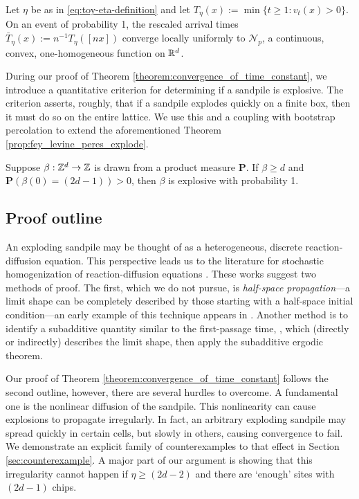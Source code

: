\documentclass[12pt]{amsart}
\begin{document}
\begin{theorem} \label{theorem:convergence_of_time_constant}
	Let $\eta$ be as in \eqref{eq:toy-eta-definition} and let $T_{\eta}(x) := \min\{t \geq 1 : v_t(x) > 0 \}$. On an event of probability 1, the rescaled arrival times $\bar{T}_{\eta}(x) := n^{-1} T_{\eta}([ n x])$
	converge locally uniformly to $\mathcal{N}_{p}$, a continuous, convex, one-homogeneous function on $\mathbb{R}^d$. 
\end{theorem}
During our proof of Theorem \ref{theorem:convergence_of_time_constant}, we introduce a quantitative criterion for determining if a sandpile is explosive. The criterion asserts, roughly, that if a sandpile explodes quickly on a finite box, then it must do so on the entire lattice. 
We use this and a coupling with bootstrap percolation to extend the aforementioned Theorem \ref{prop:fey_levine_peres_explode}. 
\begin{theorem} \label{theorem:explosive}
	Suppose $\beta:\mathbb{Z}^d \to \mathbb{Z}$ is drawn from a product measure $\mathbf{P}$.  If $\beta \geq d$ and $\mathbf{P}(\beta(0) = (2 d - 1)) > 0$,
	then $\beta$ is explosive with probability 1.
\end{theorem}



\subsection{Proof outline}
An exploding sandpile may be thought of as a heterogeneous, discrete reaction-diffusion equation. This perspective leads us to the literature for stochastic homogenization of reaction-diffusion equations \cite{zhang2020long, feldman2019mean, lin2019stochastic, armstrong2018stochastic, caffarelli2014counter, gravner2006random, ishii1999threshold, barles1998new, gravner1996first,gravner1993threshold, willson1978convergence}. These works suggest two methods of proof. The first, which we do not pursue, is {\it half-space propagation}---a limit shape can be completely described by those starting with a half-space initial condition---an early example of this technique appears in \cite{willson1978convergence}. 
Another method is to identify a subadditive quantity similar to the first-passage time, \cite{cox1981some}, which (directly or indirectly) describes the limit shape, then apply the subadditive ergodic theorem.


Our proof of Theorem \ref{theorem:convergence_of_time_constant} follows the second outline,
however, there are several hurdles to overcome. A fundamental one is the nonlinear diffusion of the sandpile. This nonlinearity can cause explosions to propagate irregularly. In fact, an arbitrary exploding sandpile may spread quickly in certain cells, but slowly in others, causing convergence to fail. We demonstrate an explicit family of counterexamples to that effect in Section \ref{sec:counterexample}. A major part of our argument is showing that this irregularity cannot happen if $\eta \geq (2 d - 2)$ and there are `enough' sites with $(2d - 1)$ chips. 
\end{document}
